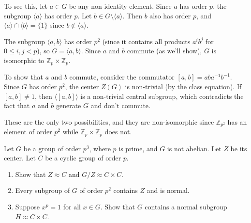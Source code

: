 To see this, let $a \in G$ be any non-identity element. Since $a$ has order $p$, the subgroup $\langle a \rangle$ has order $p$. Let $b \in G \setminus \langle a \rangle$. Then $b$ also has order $p$, and $\langle a \rangle \cap \langle b \rangle = \{1\}$ since $b \notin \langle a \rangle$.

The subgroup $\langle a, b \rangle$ has order $p^2$ (since it contains all products $a^ib^j$ for $0 \leq i, j < p$), so $G = \langle a, b \rangle$. Since $a$ and $b$ commute (as we'll show), $G$ is isomorphic to $\mathbb{Z}_p \times \mathbb{Z}_p$.

To show that $a$ and $b$ commute, consider the commutator $[a,b] = aba^{-1}b^{-1}$. Since $G$ has order $p^2$, the center $Z(G)$ is non-trivial (by the class equation). If $[a,b] \neq 1$, then $\langle [a,b] \rangle$ is a non-trivial central subgroup, which contradicts the fact that $a$ and $b$ generate $G$ and don't commute.

These are the only two possibilities, and they are non-isomorphic since $\mathbb{Z}_{p^2}$ has an element of order $p^2$ while $\mathbb{Z}_p \times \mathbb{Z}_p$ does not.

\begin{problembox}
Let $G$ be a group of order $p^3$, where $p$ is prime, and $G$ is not abelian. Let $Z$ be its center. Let $C$ be a cyclic group of order $p$.
\begin{enumerate}[label=(\alph*)]
\item Show that $Z \approx C$ and $G/Z \approx C \times C$.
\item Every subgroup of $G$ of order $p^2$ contains $Z$ and is normal.
\item Suppose $x^p = 1$ for all $x \in G$. Show that $G$ contains a normal subgroup $H \approx C \times C$.
\end{enumerate}
\end{problembox}

